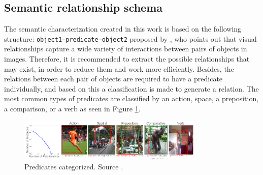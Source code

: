 \subsection{Semantic relationship schema}
The semantic characterization created in this work is based on the following structure: \texttt{object1--predicate--object2} proposed by \cite{Cewu}, who points out that visual relationships capture a wide variety of interactions between pairs of objects in images. Therefore, it is recommended to extract the possible relationships that may exist, in order to reduce them and work more efficiently. Besides, the relations between each pair of objects are required to have a predicate individually, and based on this a classification is made to generate a relation. The most common types of predicates are classified by an action, space, a preposition, a comparison, or a verb as seen in Figure \ref{fig:predaCar}.

\begin{figure}[H]
    \centering
    \includegraphics[width=8.8cm]{figures/predica.png}
    \caption{Predicates categorized. Source \cite{Cewu}.}
    \label{fig:predaCar}
\end{figure}

